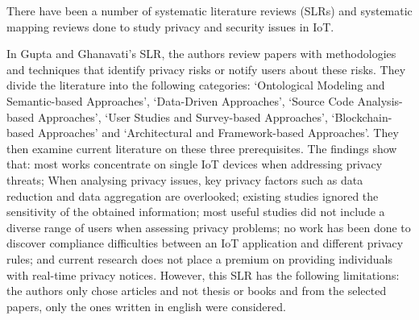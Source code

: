 There have been a number of systematic literature reviews (SLRs) \cite{Gupta2022Privacy, Kuhtreiber2022survey, sicari2015security, LinSurvey, yang2022overview, zubaydi2023leveraging}
and systematic mapping reviews \cite{porras2018security, ahmed2019aspects}
done to study privacy and security issues in IoT.

In Gupta and Ghanavati's \cite{Gupta2022Privacy} SLR, the authors review
papers with methodologies and techniques that identify privacy risks or
notify users about these risks. They divide the literature into the following
categories: `Ontological Modeling and Semantic-based Approaches', `Data-Driven
Approaches', `Source Code Analysis-based Approaches', `User Studies and
Survey-based Approaches', `Blockchain-based Approaches' and `Architectural
and Framework-based Approaches'. They then examine current literature on
these three prerequisites. The findings show that: most works concentrate
on single IoT devices when addressing privacy threats; When analysing privacy
issues, key privacy factors such as data reduction and data aggregation
are overlooked; existing studies ignored the sensitivity of the obtained
information; most useful studies did not include a diverse range of users
when assessing privacy problems; no work has been done to discover compliance
difficulties between an IoT application and different privacy rules; and
current research does not place a premium on providing individuals with real-time
privacy notices. However, this SLR has the following limitations: the authors
only chose articles and not thesis or books and from the selected papers,
only the ones written in english were considered.



